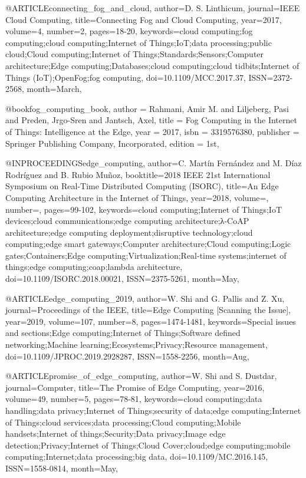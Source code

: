 @ARTICLE{connecting_fog_and_cloud,
    author={D. S. {Linthicum}},
    journal={IEEE Cloud Computing},
    title={Connecting Fog and Cloud Computing},
    year={2017},
    volume={4},
    number={2},
    pages={18-20},
    keywords={cloud computing;fog computing;cloud computing;Internet of Things;IoT;data processing;public cloud;Cloud computing;Internet of Things;Standards;Sensors;Computer architecture;Edge computing;Databases;cloud computing;cloud tidbits;Internet of Things (IoT);OpenFog;fog computing},
    doi={10.1109/MCC.2017.37},
    ISSN={2372-2568},
    month={March},
}
  
@book{fog_computing_book,
    author = {Rahmani, Amir M. and Liljeberg, Pasi and Preden, Jrgo-Sren and Jantsch, Axel},
    title = {Fog Computing in the Internet of Things: Intelligence at the Edge},
    year = {2017},
    isbn = {3319576380},
    publisher = {Springer Publishing Company, Incorporated},
    edition = {1st},
}

@INPROCEEDINGS{edge_computing,
    author={C. {Martín Fernández} and M. {Díaz Rodríguez} and B. {Rubio Muñoz}},
    booktitle={2018 IEEE 21st International Symposium on Real-Time Distributed Computing (ISORC)},
    title={An Edge Computing Architecture in the Internet of Things},
    year={2018},
    volume={},
    number={},
    pages={99-102},
    keywords={cloud computing;Internet of Things;IoT devices;cloud communications;edge computing architecture;λ-CoAP architecture;edge computing deployment;disruptive technology;cloud computing;edge smart gateways;Computer architecture;Cloud computing;Logic gates;Containers;Edge computing;Virtualization;Real-time systems;internet of things;edge computing;coap;lambda architecture},
    doi={10.1109/ISORC.2018.00021},
    ISSN={2375-5261},
    month={May},
}

@ARTICLE{edge_computing_2019,
    author={W. {Shi} and G. {Pallis} and Z. {Xu}},
    journal={Proceedings of the IEEE},
    title={Edge Computing [Scanning the Issue]},
    year={2019},
    volume={107},
    number={8},
    pages={1474-1481},
    keywords={Special issues and sections;Edge computing;Internet of Things;Software defined networking;Machine learning;Ecosystems;Privacy;Resource management},
    doi={10.1109/JPROC.2019.2928287},
    ISSN={1558-2256},
    month={Aug},
}

@ARTICLE{promise_of_edge_computing,
    author={W. {Shi} and S. {Dustdar}},
    journal={Computer},
    title={The Promise of Edge Computing},
    year={2016},
    volume={49},
    number={5},
    pages={78-81},
    keywords={cloud computing;data handling;data privacy;Internet of Things;security of data;edge computing;Internet of Things;cloud services;data processing;Cloud computing;Mobile handsets;Internet of things;Security;Data privacy;Image edge detection;Privacy;Internet of Things;Cloud Cover;cloud;edge computing;mobile computing;Internet;data processing;big data},
    doi={10.1109/MC.2016.145},
    ISSN={1558-0814},
    month={May},
}

